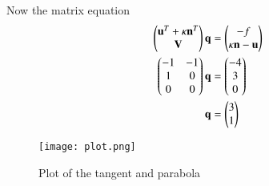 \documentclass[journal,12pt,twocolumn]{IEEEtran}
\begin{document}
Now the matrix equation 
\begin{align}
    \begin{pmatrix}\mathbf{u}^T+\kappa\mathbf{n}^T\\\mathbf{V}\end{pmatrix}\mathbf{q} &= \begin{pmatrix}-f\\ \kappa\mathbf{n}-\mathbf{u}\end{pmatrix}\\
    \begin{pmatrix}-1 &-1\\1 &0\\0 &0\end{pmatrix}\mathbf{q} &= \begin{pmatrix}-4\\3\\0\end{pmatrix}\\
    \mathbf{q} &= \begin{pmatrix}3\\1\end{pmatrix}
\end{align}
\begin{figure}[ht]
    \centering
    \texttt{[image: plot.png]}
    \caption{Plot of the tangent and parabola}
    \label{plot}
\end{figure}
\end{document}
